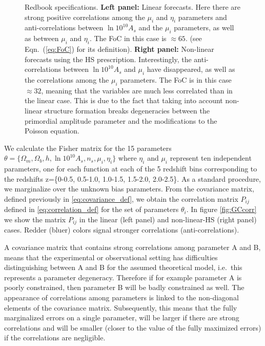 \begin{figure}[htbp]
{Redbook specifications. \textbf{Left panel:}
Linear forecasts. Here there are strong positive correlations among the $\mu_i$ and $\eta_i$ parameters and anti-correlations between
 $\ln10^{10}A_{s}$  and the $\mu_i$ parameters, as well as between $\mu_i$ and $\eta_i$. The FoC in this case is $\approx 65$. (see Eqn.\ (\ref{eq:FoC}) for its definition).
\textbf{Right panel: } Non-linear 
forecasts using the HS prescription. Interestingly, the anti-correlations between  $\ln10^{10}A_{s}$  and $\mu_i$ 
have disappeared, as well as the correlations among the  $\mu_i$ parameters. The FoC is in this case   $\approx 32$, meaning that the variables are much less correlated than in the linear case.
This is due to the fact that taking into account non-linear structure formation breaks degeneracies between the primordial amplitude parameter and the modifications
to the Poisson equation.}
\end{figure}


We calculate the Fisher matrix for the 15 parameters \\
$\theta=\{\Omega_{m},\Omega_{b},h,\ln10^{10}A_{s},n_{s},\mu_{i},\eta_{i}\}$
where $\eta_{i}$ and $\mu_{i}$ represent ten independent parameters, one for each function
at each of the 5 redshift bins corresponding to the redshifts z=\{0-0.5, 0.5-1.0, 1.0-1.5, 1.5-2.0, 2.0-2.5\}. As a standard procedure, we marginalize over the unknown bias parameters.
From the covariance matrix, defined
previously in \cref{eq:covariance_def}, we obtain the correlation
matrix $P_{ij}$ defined in \cref{eq:correlation_def} for the
set of parameters $\theta_{i}$. In figure \ref{fig:GCcorr} we show
the matrix $P_{ij}$ in the linear (left panel) and non-linear-HS
(right panel) cases. Redder (bluer) colors signal stronger correlations
(anti-correlations). 

A covariance matrix that contains strong correlations among parameter A and B, means that the 
experimental or observational setting has difficulties distinguishing between A and B for the assumed theoretical model, i.e.\ this represents a parameter degeneracy.
Therefore if for example parameter A is poorly constrained, then parameter B will be badly constrained as well.
The appearance of correlations among parameters is linked to the non-diagonal elements of the covariance matrix. Subsequently, this means that
the fully marginalized errors on a single parameter, will be larger if there are strong correlations and will be smaller (closer to the value of the
fully maximized errors) if the correlations are negligible.

